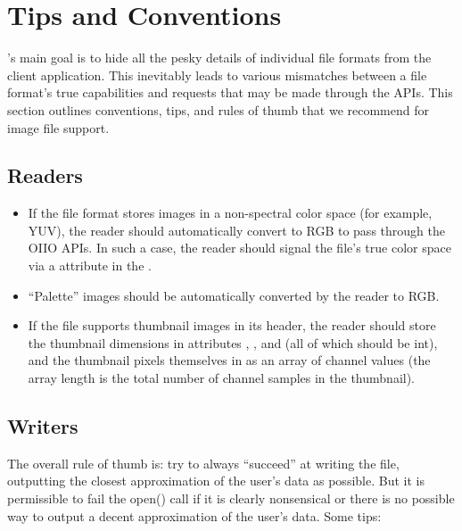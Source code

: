 \section{Tips and Conventions}
\label{sec:plugintipsconventions}

\product's main goal is to hide all the pesky details of individual file
formats from the client application.  This inevitably leads to various
mismatches between a file format's true capabilities and requests that
may be made through the \product APIs.  This section outlines
conventions, tips, and rules of thumb that we recommend for image file
support.

\subsection*{Readers}
\begin{itemize}
\item If the file format stores images in a non-spectral color space
  (for example, YUV), the reader should automatically convert to RGB to
  pass through the OIIO APIs.  In such a case, the reader should signal
  the file's true color space via a  attribute in
  the \ImageSpec.
\item ``Palette'' images should be automatically converted by the reader
  to RGB.
\item If the file supports thumbnail images in its header, the reader
  should store the thumbnail dimensions in attributes
  , , and
   (all of which should be {\cf int}), and the
  thumbnail pixels themselves in  as an array of
  channel values (the array length is the total number of channel
  samples in the thumbnail).
\end{itemize}

\subsection*{Writers}

The overall rule of thumb is: try to always ``succeed'' at writing the
file, outputting the closest approximation of the user's data as
possible.  But it is permissible to fail the {\cf open()} call if it is
clearly nonsensical or there is no possible way to output a decent
approximation of the user's data.  Some tips:

